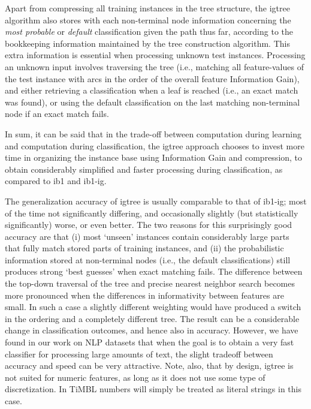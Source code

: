 \documentclass{report}
\begin{document}
Apart from compressing all training instances in the tree structure,
the {\sc igtree} algorithm also stores with each non-terminal node
information concerning the {\em most probable} or {\em default}
classification given the path thus far, according to the bookkeeping
information maintained by the tree construction algorithm. This extra
information is essential when processing unknown test instances.
Processing an unknown input involves traversing the tree (i.e.,
matching all feature-values of the test instance with arcs in the
order of the overall feature Information Gain), and either retrieving
a classification when a leaf is reached (i.e., an exact match was
found), or using the default classification on the last matching
non-terminal node if an exact match fails.

In sum, it can be said that in the trade-off between computation
during learning and computation during classification, the {\sc
igtree} approach chooses to invest more time in organizing the
instance base using Information Gain and compression, to obtain
considerably simplified and faster processing during classification,
as compared to {\sc ib1} and {\sc ib1-ig}.
 
The generalization accuracy of {\sc igtree} is usually comparable to
that of {\sc ib1-ig}; most of the time not significantly differing,
and occasionally slightly (but statistically significantly) worse, or
even better.  The two reasons for this surprisingly good accuracy are
that (i) most `unseen' instances contain considerably large parts that
fully match stored parts of training instances, and (ii) the
probabilistic information stored at non-terminal nodes (i.e., the
default classifications) still produces strong `best guesses' when
exact matching fails. The difference between the top-down traversal of
the tree and precise nearest neighbor search becomes more pronounced
when the differences in informativity between features are small. In
such a case a slightly different weighting would have produced a
switch in the ordering and a completely different tree. The result can
be a considerable change in classification outcomes, and hence also in
accuracy. However, we have found in our work on NLP datasets that when
the goal is to obtain a very fast classifier for processing large
amounts of text, the slight tradeoff between accuracy and speed can be
very attractive. Note, also, that by design, {\sc igtree} is not suited
for numeric features, as long as it does not use some type of
discretization. In TiMBL numbers will simply be treated as literal
strings in this case.
\end{document}
